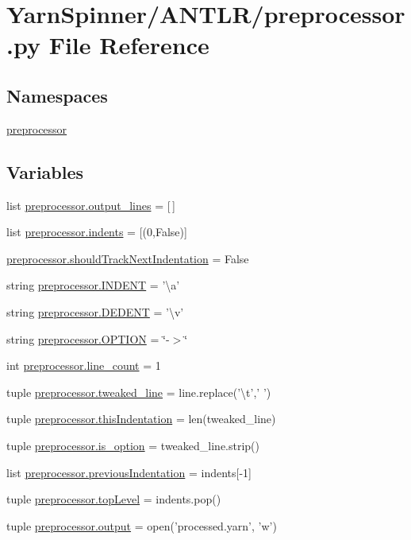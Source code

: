 \hypertarget{a00283}{\section{Yarn\-Spinner/\-A\-N\-T\-L\-R/preprocessor.py File Reference}
\label{a00283}
}
\subsection*{Namespaces}
\begin{DoxyCompactItemize}
\item 
\hyperlink{a00324}{preprocessor}
\end{DoxyCompactItemize}
\subsection*{Variables}
\begin{DoxyCompactItemize}
\item 
list \hyperlink{a00324_a3766d6a1d728423223fa0743ba62011f}{preprocessor.\-output\-\_\-lines} = \mbox{[}$\,$\mbox{]}
\item 
list \hyperlink{a00324_a00fba9ee9674b2513dbe28eab795b734}{preprocessor.\-indents} = \mbox{[}(0,False)\mbox{]}
\item 
\hyperlink{a00324_afa485f45ab87bc0f06c1dfc46737c057}{preprocessor.\-should\-Track\-Next\-Indentation} = False
\item 
string \hyperlink{a00324_ae3f2190a793ab77428838e58e0e83676}{preprocessor.\-I\-N\-D\-E\-N\-T} = '\textbackslash{}a'
\item 
string \hyperlink{a00324_a83653c3e52fa74614e655a91ad2b7181}{preprocessor.\-D\-E\-D\-E\-N\-T} = '\textbackslash{}v'
\item 
string \hyperlink{a00324_a7ca2dc5371587b21476669a45af013cd}{preprocessor.\-O\-P\-T\-I\-O\-N} = \char`\"{}-\/$>$\char`\"{}
\item 
int \hyperlink{a00324_ac7b4a28b6670884cd095cd684a452c94}{preprocessor.\-line\-\_\-count} = 1
\item 
tuple \hyperlink{a00324_acab50490b6d7a9dc2bb935ad4ffe2eff}{preprocessor.\-tweaked\-\_\-line} = line.\-replace('\textbackslash{}t',' ')
\item 
tuple \hyperlink{a00324_a0e59365a4aa5811f6495b92a51e23573}{preprocessor.\-this\-Indentation} = len(tweaked\-\_\-line)
\item 
tuple \hyperlink{a00324_abf34284b1c9a00275810e5c13a4dcea2}{preprocessor.\-is\-\_\-option} = tweaked\-\_\-line.\-strip()
\item 
list \hyperlink{a00324_ade44b858578c3eab7b6f90030a0e3ea1}{preprocessor.\-previous\-Indentation} = indents\mbox{[}-\/1\mbox{]}
\item 
tuple \hyperlink{a00324_a8b7e5c0b2c6870eaa8f9454b4f33678b}{preprocessor.\-top\-Level} = indents.\-pop()
\item 
tuple \hyperlink{a00324_a3da6d48778c7b08a040bf24377f67792}{preprocessor.\-output} = open('processed.\-yarn', 'w')
\end{DoxyCompactItemize}
